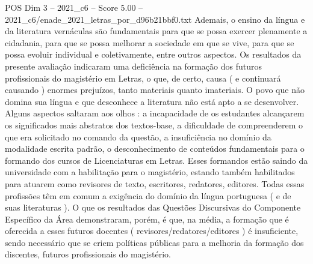 \begin{textsample}{POS Dim 3 – 2021\_c6 – Score 5.00 – 2021\_c6/enade\_2021\_letras\_por\_d96b21bbf0.txt}
Ademais, o ensino da língua e da literatura vernáculas são fundamentais para que se possa exercer plenamente a cidadania, para que se possa melhorar a sociedade em que se vive, para que se possa evoluir individual e coletivamente, entre outros aspectos.
Os resultados da presente avaliação indicaram uma deficiência na formação dos futuros profissionais do magistério em Letras, o que, de certo, causa ( e continuará causando ) enormes prejuízos, tanto materiais quanto imateriais.
O povo que não domina sua língua e que desconhece a literatura não está apto a se desenvolver.
Alguns aspectos saltaram aos olhos : a incapacidade de os estudantes alcançarem os significados mais abstratos dos textos-base, a dificuldade de compreenderem o que era solicitado no comando da questão, a insuficiência no domínio da modalidade escrita padrão, o desconhecimento de conteúdos fundamentais para o formando dos cursos de Licenciaturas em Letras.
Esses formandos estão saindo da universidade com a habilitação para o magistério, estando também habilitados para atuarem como revisores de texto, escritores, redatores, editores.
Todas essas profissões têm em comum a exigência do domínio da língua portuguesa ( e de suas literaturas ).
O que os resultados das Questões Discursivas do Componente Específico da Área demonstraram, porém, é que, na média, a formação que é oferecida a esses futuros docentes ( revisores/redatores/editores ) é insuficiente, sendo necessário que se criem políticas públicas para a melhoria da formação dos discentes, futuros profissionais do magistério.

\end{textsample}
